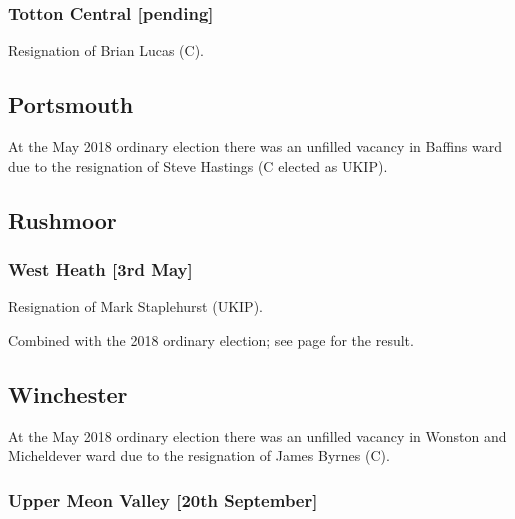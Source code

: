 \documentclass[a4paper,openany]{book}
\begin{document}
\begin{resultsiii}
\subsubsection*{Totton Central \hspace*{\fill}\nolinebreak[1]%
	\enspace\hspace*{\fill}
	[pending]}


Resignation of Brian Lucas (C).

\subsection*{Portsmouth}

At the May 2018 ordinary election there was an unfilled vacancy in Baffins ward due to the resignation of Steve Hastings (C elected as UKIP).

\subsection*{Rushmoor}

\subsubsection*{West Heath \hspace*{\fill}\nolinebreak[1]%
\enspace\hspace*{\fill}
[3rd May]}


Resignation of Mark Staplehurst (UKIP).

Combined with the 2018 ordinary election; see page \pageref{WestHeathRushmoor} for the result.

\subsection*{Winchester}

At the May 2018 ordinary election there was an unfilled vacancy in Wonston and Micheldever ward due to the resignation of James Byrnes (C).

\subsubsection*{Upper Meon Valley \hspace*{\fill}\nolinebreak[1]%
	\enspace\hspace*{\fill}
	[20th September]}


\end{resultsiii}
\end{document}
